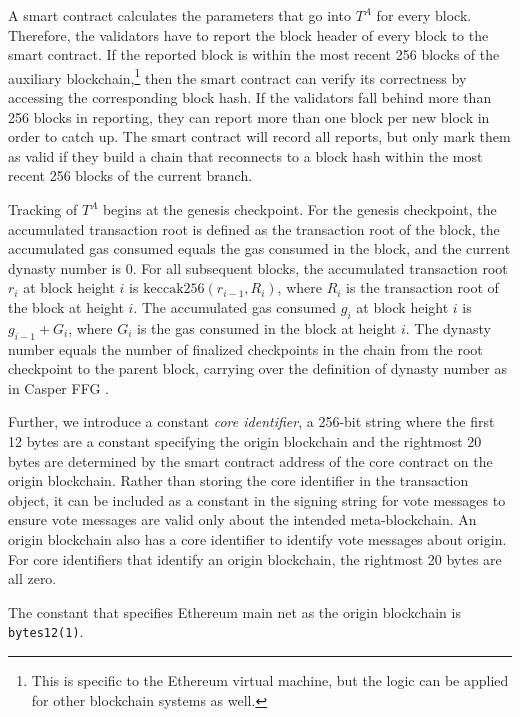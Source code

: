 \documentclass[12pt,a4paper]{article}
\begin{document}
A smart contract calculates the parameters that go into $T^A$ for every block.
Therefore, the validators have to report the block header of every block to the smart contract.
If the reported block is within the most recent 256 blocks of the auxiliary blockchain,\footnote{
	This is specific to the Ethereum virtual machine, but the logic can be applied for other blockchain systems as well.
}
then the smart contract can verify its correctness by accessing the corresponding block hash.
If the validators fall behind more than 256 blocks in reporting, they can report more than one block per new block in order to catch up.
The smart contract will record all reports, but only mark them as valid if they build a chain that reconnects to a block hash within the most recent 256 blocks of the current branch.

Tracking of $T^A$ begins at the genesis checkpoint.
For the genesis checkpoint, the accumulated transaction root is defined as the transaction root of the block, the accumulated gas consumed equals the gas consumed in the block, and the current dynasty number is 0.
For all subsequent blocks, the accumulated transaction root $r_i$ at block height $i$ is $\text{keccak256}(r_{i-1}, R_i)$, where $R_i$ is the transaction root of the block at height $i$.
The accumulated gas consumed $g_i$ at block height $i$ is $g_{i-1} + G_i$, where $G_i$ is the gas consumed in the block at height $i$.
The dynasty number equals the number of finalized checkpoints in the chain from the root checkpoint to the parent block, carrying over the definition of dynasty number as in Casper FFG \cite{casperffg}.

Further, we introduce a constant \emph{core identifier}, a 256-bit string where the first 12 bytes are a constant specifying the origin blockchain and the rightmost 20 bytes are determined by the smart contract address of the core contract on the origin blockchain.
Rather than storing the core identifier in the transaction object, it can be included as a constant in the signing string for vote messages to ensure vote messages are valid only about the intended meta-blockchain.
An origin blockchain also has a core identifier to identify vote messages about origin.
For core identifiers that identify an origin blockchain, the rightmost 20 bytes are all zero.

The constant that specifies Ethereum main net as the origin blockchain is \texttt{bytes12(1)}.


\end{document}
